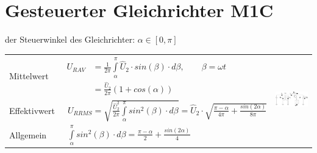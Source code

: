 \section{Gesteuerter Gleichrichter M1C}
der Steuerwinkel des Gleichrichter: $\alpha \in [0, \pi]$


\begin{tabu}{|l|l|p{0.3\textwidth}}
  Mittelwert 
  	& $\begin{aligned}
  		U_{R AV} &= \frac{1}{2\pi}\int\limits_{\alpha}^{\pi}\hat{U}_{2} \cdot sin(\beta) \cdot d\beta, \qquad \beta = \omega t\\
  				&= \frac{\hat{U}_{2}}{2\pi}(1 + cos(\alpha))
  		\end{aligned}$
  		& \\
  Effektivwert 
  	&\ $U_{R RMS} = \sqrt{\frac{\hat{U}_{2}^2}{2\pi}\int\limits_{\alpha}^{\pi}sin^2(\beta) \cdot d\beta} = \hat{U}_{2} \cdot \sqrt{\frac{\pi-\alpha}{4\pi}+\frac{sin(2\alpha)}{8\pi}}$ &\\
  Allgemein
  	&\ $\int\limits_{\alpha}^{\pi}sin^2(\beta) \cdot d\beta = \frac{\pi-\alpha}{2}+\frac{sin(2\alpha)}{4}$&\\
\end{tabu}